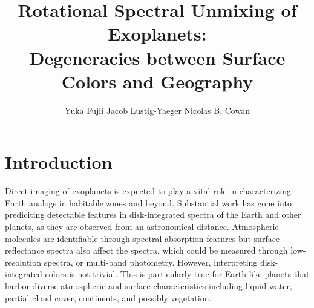 \documentclass[iop,numberedappendix,apj,]{emulateapj}
\begin{document}
\title{Rotational Spectral Unmixing of Exoplanets:\\Degeneracies between Surface Colors and Geography}


\author{
%
Yuka Fujii 
%
Jacob Lustig-Yaeger 
%
Nicolas B. Cowan 
%
}

      
  







\vspace{0.5\baselineskip}


\begin{abstract}

\end{abstract}

  



\section{Introduction}
\label{sec:intro}

Direct imaging of exoplanets is expected to play a vital role in characterizing Earth analogs in habitable zones and beyond. 
Substantial work has gone into prediciting detectable features in disk-integrated spectra of the Earth and other planets, as they are observed from an astronomical distance. 
Atmospheric molecules are identifiable through spectral absorption features \citep[e.g.,][]{DesMarais2002} but surface reflectance spectra also affect the spectra, which could be measured through low-resolution spectra, or multi-band photometry. 
However, interpreting disk-integrated colors is not trivial. 
This is particularly true for Earth-like planets that harbor diverse atmospheric and surface characteristics including liquid water, partial cloud cover, continents, and possibly vegetation. 
\end{document}
